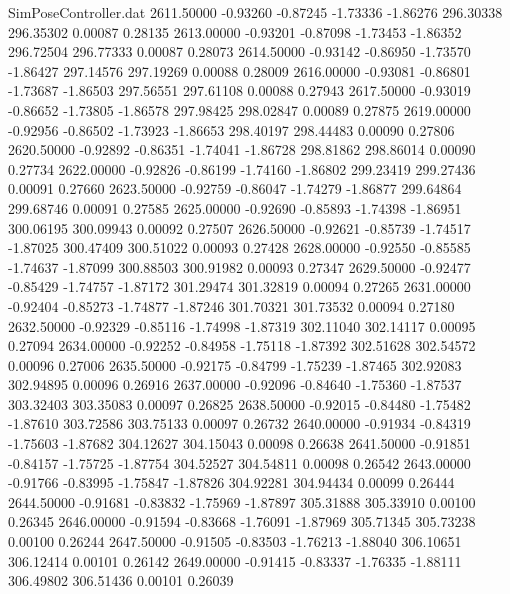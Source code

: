\begin{filecontents}{SimPoseController.dat}
2611.50000   -0.93260   -0.87245    -1.73336   -1.86276  296.30338  296.35302    0.00087    0.28135
2613.00000   -0.93201   -0.87098    -1.73453   -1.86352  296.72504  296.77333    0.00087    0.28073
2614.50000   -0.93142   -0.86950    -1.73570   -1.86427  297.14576  297.19269    0.00088    0.28009
2616.00000   -0.93081   -0.86801    -1.73687   -1.86503  297.56551  297.61108    0.00088    0.27943
2617.50000   -0.93019   -0.86652    -1.73805   -1.86578  297.98425  298.02847    0.00089    0.27875
2619.00000   -0.92956   -0.86502    -1.73923   -1.86653  298.40197  298.44483    0.00090    0.27806
2620.50000   -0.92892   -0.86351    -1.74041   -1.86728  298.81862  298.86014    0.00090    0.27734
2622.00000   -0.92826   -0.86199    -1.74160   -1.86802  299.23419  299.27436    0.00091    0.27660
2623.50000   -0.92759   -0.86047    -1.74279   -1.86877  299.64864  299.68746    0.00091    0.27585
2625.00000   -0.92690   -0.85893    -1.74398   -1.86951  300.06195  300.09943    0.00092    0.27507
2626.50000   -0.92621   -0.85739    -1.74517   -1.87025  300.47409  300.51022    0.00093    0.27428
2628.00000   -0.92550   -0.85585    -1.74637   -1.87099  300.88503  300.91982    0.00093    0.27347
2629.50000   -0.92477   -0.85429    -1.74757   -1.87172  301.29474  301.32819    0.00094    0.27265
2631.00000   -0.92404   -0.85273    -1.74877   -1.87246  301.70321  301.73532    0.00094    0.27180
2632.50000   -0.92329   -0.85116    -1.74998   -1.87319  302.11040  302.14117    0.00095    0.27094
2634.00000   -0.92252   -0.84958    -1.75118   -1.87392  302.51628  302.54572    0.00096    0.27006
2635.50000   -0.92175   -0.84799    -1.75239   -1.87465  302.92083  302.94895    0.00096    0.26916
2637.00000   -0.92096   -0.84640    -1.75360   -1.87537  303.32403  303.35083    0.00097    0.26825
2638.50000   -0.92015   -0.84480    -1.75482   -1.87610  303.72586  303.75133    0.00097    0.26732
2640.00000   -0.91934   -0.84319    -1.75603   -1.87682  304.12627  304.15043    0.00098    0.26638
2641.50000   -0.91851   -0.84157    -1.75725   -1.87754  304.52527  304.54811    0.00098    0.26542
2643.00000   -0.91766   -0.83995    -1.75847   -1.87826  304.92281  304.94434    0.00099    0.26444
2644.50000   -0.91681   -0.83832    -1.75969   -1.87897  305.31888  305.33910    0.00100    0.26345
2646.00000   -0.91594   -0.83668    -1.76091   -1.87969  305.71345  305.73238    0.00100    0.26244
2647.50000   -0.91505   -0.83503    -1.76213   -1.88040  306.10651  306.12414    0.00101    0.26142
2649.00000   -0.91415   -0.83337    -1.76335   -1.88111  306.49802  306.51436    0.00101    0.26039

\end{filecontents}
